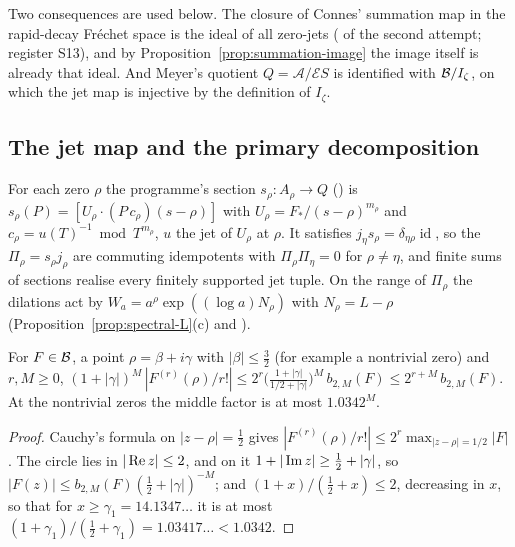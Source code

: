 Two consequences are used below.
The closure of Connes' summation map in the rapid-decay Fréchet space is the ideal of all zero-jets ( of the second attempt; register S13), and by Proposition~\ref{prop:summation-image} the image itself is already that ideal.
And Meyer's quotient $Q=\mathcal{A}/\mathcal{E}S$ is identified with $\mathcal{B}/I_\zeta$, on which the jet map is injective by the definition of $I_\zeta$.

\subsection{The jet map and the primary decomposition}

For each zero $\rho$ the programme's section $s_\rho:A_\rho\to Q$ () is $s_\rho(P)=[U_\rho\cdot(P\,c_\rho)(s-\rho)]$ with $U_\rho=F_*/(s-\rho)^{m_\rho}$ and $c_\rho=u(T)^{-1}\bmod T^{m_\rho}$, $u$ the jet of $U_\rho$ at $\rho$.
It satisfies $j_\eta s_\rho=\delta_{\eta\rho}\operatorname{id}$, so the $\Pi_\rho=s_\rho j_\rho$ are commuting idempotents with $\Pi_\rho\Pi_\eta=0$ for $\rho\ne\eta$, and finite sums of sections realise every finitely supported jet tuple.
On the range of $\Pi_\rho$ the dilations act by $W_a=a^\rho\exp((\log a)N_\rho)$ with $N_\rho=L-\rho$ (Proposition~\ref{prop:spectral-L}(c) and ).

\begin{lemma}\label{lem:jetdecay}
For $F\in\mathcal{B}$, a point $\rho=\beta+i\gamma$ with $|\beta|\le\tfrac32$ (for example a nontrivial zero) and $r,M\ge0$,
\(
(1+|\gamma|)^M\,|F^{(r)}(\rho)/r!|\le2^{r}\big(\tfrac{1+|\gamma|}{1/2+|\gamma|}\big)^M\,b_{2,M}(F)\le2^{r+M}\,b_{2,M}(F).
\)
At the nontrivial zeros the middle factor is at most $1.0342^M$.
\end{lemma}

\begin{proof}
Cauchy's formula on $|z-\rho|=\tfrac12$ gives $|F^{(r)}(\rho)/r!|\le2^r\max_{|z-\rho|=1/2}|F|$. The circle lies in $|\operatorname{Re} z|\le2$, and on it $1+|\operatorname{Im} z|\ge\tfrac12+|\gamma|$, so $|F(z)|\le b_{2,M}(F)(\tfrac12+|\gamma|)^{-M}$; and $(1+x)/(\tfrac12+x)\le2$, decreasing in $x$, so that for $x\ge\gamma_1=14.1347\ldots$ it is at most $(1+\gamma_1)/(\tfrac12+\gamma_1)=1.03417\ldots<1.0342$.
\end{proof}

